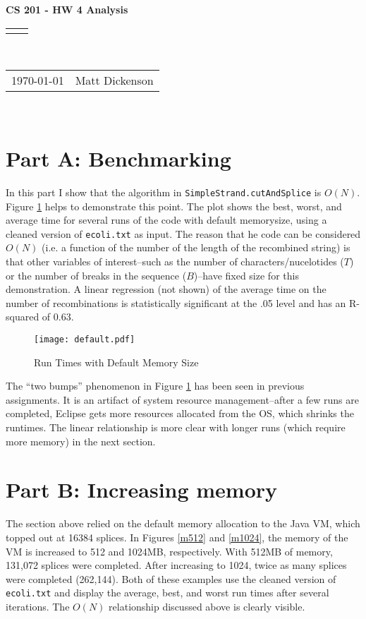 \documentclass[12pt]{article}
\renewcommand{\title}[1]{\textbf{#1}\\}
\renewcommand{\line}{\begin{tabularx}{\textwidth}{X>{\raggedleft}X}\hline\\\end{tabularx}\\[-0.5cm]}
\newcommand{\leftright}[2]{\begin{tabularx}{\textwidth}{X>{\raggedleft}X}#1%
& #2\\\end{tabularx}\\[-0.5cm]}
\begin{document}
\title{CS 201 - HW 4 Analysis}
\line
\leftright{\today}{Matt Dickenson} %
\setlength{\parindent}{16pt}

\section*{Part A: Benchmarking}

In this part I show that the algorithm in \texttt{SimpleStrand.cutAndSplice} is $O(N)$. Figure \ref{default} helps to demonstrate this point. The plot shows the best, worst, and average time for several runs of the code with default memorysize, using a cleaned version of \texttt{ecoli.txt} as input. The reason that he code can be considered $O(N)$ (i.e. a function of the number of the length of the recombined string) is that other variables of interest--such as the number of characters/nucelotides ($T$) or the number of breaks in the sequence ($B$)--have fixed size for this demonstration. A linear regression (not shown) of the average time on the number of recombinations is statistically significant at the .05 level and has an R-squared of 0.63. 

\begin{center}
\begin{figure}[h!]
\centering
\texttt{[image: default.pdf]}
\caption{Run Times with Default Memory Size}
\label{default}
\end{figure}
\end{center}

The ``two bumps'' phenomenon in Figure \ref{default} has been seen in previous assignments. It is an artifact of system resource management--after a few runs are completed, Eclipse gets more resources allocated from the OS, which shrinks the runtimes. The linear relationship is more clear with longer runs (which require more memory) in the next section. 

\section*{Part B: Increasing memory}

The section above relied on the default memory allocation to the Java VM, which topped out at 16384 splices. In Figures \ref{m512} and \ref{m1024}, the memory of the VM is increased to 512 and 1024MB, respectively. With 512MB of memory, 131,072 splices were completed. After increasing to 1024, twice as many splices were completed (262,144). Both of these examples use the cleaned version of \texttt{ecoli.txt} and display the average, best, and worst run times after several iterations. The $O(N)$ relationship discussed above is clearly visible. 
\end{document}

